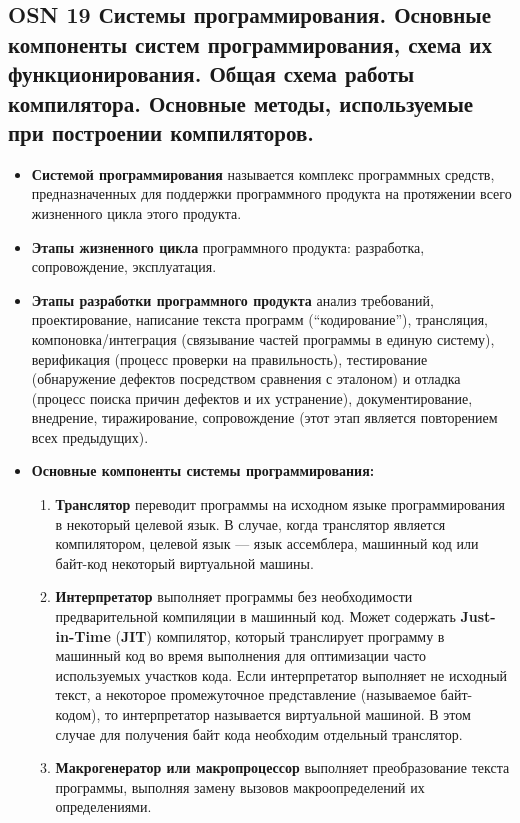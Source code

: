 \subsection{OSN 19 Системы программирования. Основные компоненты систем программирования, схема их функционирования. Общая схема работы компилятора. Основные методы, используемые при построении компиляторов.}

\begin{itemize}
    \item \textbf{Системой программирования} называется комплекс программных средств, предназначенных для поддержки программного продукта на протяжении всего жизненного цикла этого продукта.
    \item \textbf{Этапы жизненного цикла} программного продукта: разработка, сопровождение, эксплуатация.
    \item \textbf{Этапы разработки программного продукта}
        анализ требований,
        проектирование,
        написание текста программ (``кодирование''),
        трансляция, компоновка/интеграция (связывание частей программы в единую систему),
        верификация (процесс проверки на правильность), тестирование (обнаружение дефектов посредством сравнения с эталоном) и отладка (процесс поиска причин дефектов и их устранение),
        документирование,
        внедрение,
        тиражирование,
        сопровождение (этот этап является повторением всех предыдущих).
    \item \textbf{Основные компоненты системы программирования:}
    \begin{enumerate}
        \item \textbf{Транслятор} переводит программы на исходном языке программирования в некоторый целевой язык.
        В случае, когда транслятор является компилятором, целевой язык --- язык ассемблера, машинный код или байт-код некоторый виртуальной машины.
        \item \textbf{Интерпретатор} выполняет программы без необходимости предварительной компиляции в машинный код.
        Может содержать \textbf{Just-in-Time} (\textbf{JIT}) компилятор, который транслирует программу в машинный код во время выполнения для оптимизации часто используемых участков кода.
        Если интерпретатор выполняет не исходный текст, а некоторое промежуточное представление (называемое байт-кодом), то интерпретатор называется виртуальной машиной.
        В этом случае для получения байт кода необходим отдельный транслятор.
        \item \textbf{Макрогенератор или макропроцессор} выполняет преобразование текста программы, выполняя замену вызовов макроопределений их определениями.

\end{enumerate}
\end{itemize}

